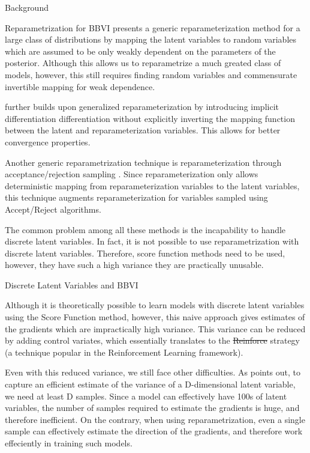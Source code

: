 \documentclass{article}
\begin{document}
\begin{psection}{Background}
\begin{psubsection}{Reparametrization for BBVI}
		\cite{gen-rep-grad} presents a generic reparameterization method for a large class of distributions by mapping the latent variables to random variables which are assumed to be only weakly dependent on the parameters of the posterior. Although this allows us to reparametrize a much greated class of models, however, this still requires finding random variables and commensurate invertible mapping for weak dependence.

		\cite{implicit-rep-grad} further builds upon generalized reparameterization \citep{gen-rep-grad} by introducing implicit differentiation \ie differentiation without explicitly inverting the mapping function between the latent and reparameterization variables. This allows for better convergence properties.

		Another generic reparametrization technique is reparameterization through acceptance/rejection sampling \citep{rep-acc-rej}. Since reparameterization only allows deterministic mapping from reparameterization variables to the latent variables, this technique augments reparameterization for variables sampled using Accept/Reject algorithms.

		The common problem among all these methods is the incapability to handle discrete latent variables. In fact, it is not possible to use reparametrization with discrete latent variables. Therefore, score function methods need to be used, however, they have such a high variance they are practically unusable.

	\end{psubsection}

	\begin{psubsection}{Discrete Latent Variables and BBVI}

		Although it is theoretically possible to learn models with discrete latent variables using the Score Function method, however, this naive approach gives estimates of the gradients which are impractically high variance. This variance can be reduced by adding control variates, which essentially translates to the \st{Reinforce} strategy (a technique popular in the Reinforcement Learning framework).

		Even with this reduced variance, we still face other difficulties. As \cite{dvae} points out, to capture an efficient estimate of the variance of a D-dimensional latent variable, we need at least D samples. Since a model can effectively have 100s of latent variables, the number of samples required to estimate the gradients is huge, and therefore inefficient. On the contrary, when using reparametrization, even a single sample can effectively estimate the direction of the gradients, and therefore work effeciently in training such models.


\end{psubsection}
\end{psection}
\end{document}
